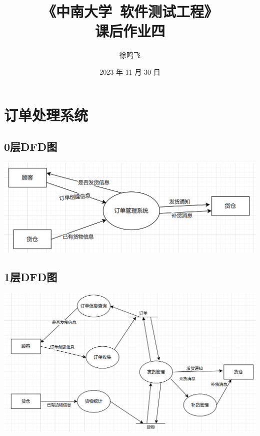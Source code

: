 \documentclass[11pt, a4paper, oneside]{ctexbook}
\title{{\Huge{\textbf{《中南大学\ 软件测试工程》}}}\\课后作业四}
\author{徐鸣飞}
\date{2023 年 11 月 30 日}
\begin{document}
\maketitle
{}
\setcounter{page}{1}
\newpage
{}
\setcounter{page}{1}
\tableofcontents
\newpage
\setcounter{page}{1}

\chapter{订单处理系统}
\section{0层DFD图}
\centering
\includegraphics[width=\textwidth]{1.png}
\label{fig:DFD0}

\newpage
\section{1层DFD图}
\centering
\includegraphics[width=\textwidth]{2.png}
\label{fig:DFD1}

\newpage
\end{document}
